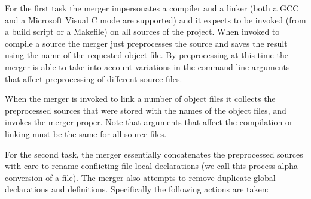 \documentclass{article}
\begin{document}
 For the first task the merger impersonates a compiler and a linker (both a
GCC and a Microsoft Visual C mode are supported) and it expects to be invoked
(from a build script or a Makefile) on all sources of the project. When
invoked to compile a source the merger just preprocesses the source and saves
the result using the name of the requested object file. By preprocessing at
this time the merger is able to take into account variations in the command
line arguments that affect preprocessing of different source files.

 When the merger is invoked to link a number of object files it collects the
preprocessed sources that were stored with the names of the object files, and
invokes the merger proper. Note that arguments that affect the compilation or
linking must be the same for all source files.

 For the second task, the merger essentially concatenates the preprocessed
sources with care to rename conflicting file-local declarations (we call this
process alpha-conversion of a file). The merger also attempts to remove
duplicate global declarations and definitions. Specifically the following
actions are taken: 
\end{document}
